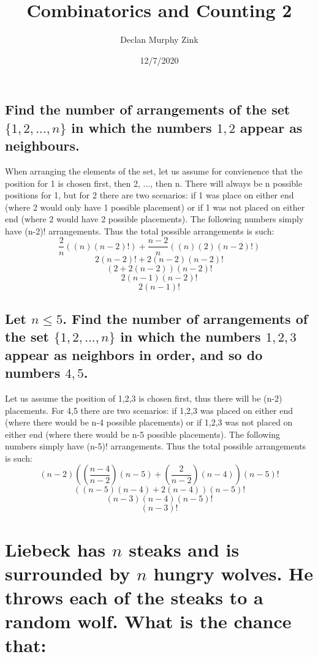 \documentclass[12pt]{article}
\begin{document}
\title{Combinatorics and Counting 2}
\author{Declan Murphy Zink}
\date{12/7/2020}
\maketitle

\setcounter{section}{5}

\section{}
\subsection{
    Find the number of arrangements of the set $\{1,2,...,n\}$ in which the numbers $1,2$ appear as neighbours.
}
When arranging the elements of the set, let us assume for convienence that the position for 1 is chosen first, then 2, ..., then n.
There will always be n possible positions for 1, but for 2 there are two scenarios:
if 1 was place on either end (where 2 would only have 1 possible placement) or if 1 was not placed on either end (where 2 would have 2 possible placements).
The following numbers simply have (n-2)! arrangements.
Thus the total possible arrangements is such:
$$\frac{2}{n}((n)(n-2)!) + \frac{n-2}{n}((n)(2)(n-2)!)$$
$$2(n-2)! + 2(n-2)(n-2)!$$
$$(2+2(n-2))(n-2)!$$
$$2(n-1)(n-2)!$$
$$2(n-1)!$$

\subsection{
    Let $n \leq 5$. Find the number of arrangements of the set $\{1,2,...,n\}$ in which the numbers $1,2,3$ appear as neighbors
    in order, and so do numbers $4,5$.
}
Let us assume the position of 1,2,3 is chosen first, thus there will be (n-2) placements.
For 4,5 there are two scenarios: if 1,2,3 was placed on either end (where there would be n-4 possible placements)
or if 1,2,3 was not placed on either end (where there would be n-5 possible placements).
The following numbers simply have (n-5)! arrangements.
Thus the total possible arrangements is such:
$$(n-2) \left( \left( \frac{n-4}{n-2} \right) (n-5) + \left( \frac{2}{n-2} \right) (n-4) \right) (n-5)!$$
$$\left((n-5)(n-4)+2(n-4)\right)(n-5)!$$
$$(n-3)(n-4)(n-5)!$$
$$(n-3)!$$

\section{
    Liebeck has $n$ steaks and is surrounded by $n$ hungry wolves. He throws each of the steaks to a random wolf. What is the chance that:
}
\end{document}
